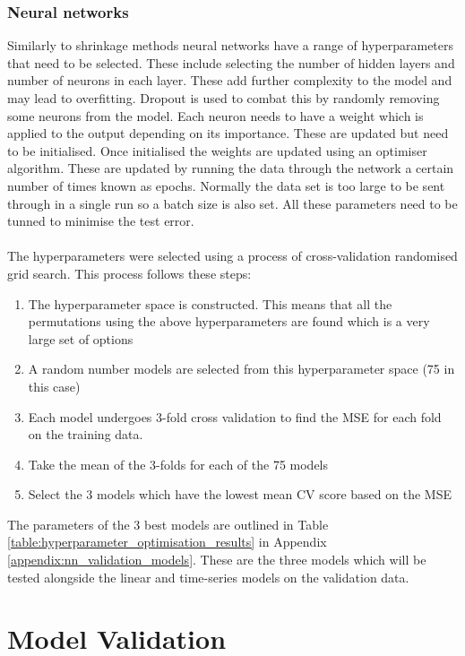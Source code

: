 \documentclass[11pt]{article}
\begin{document}
\subsubsection{Neural networks}

Similarly to shrinkage methods neural networks have a range of hyperparameters that need to be selected. These include selecting the number of hidden layers and number of neurons in each layer. These add further complexity to the model and may lead to overfitting. Dropout is used to combat this by randomly removing some neurons from the model. Each neuron needs to have a weight which is applied to the output depending on its importance. These are updated but need to be initialised. Once initialised the weights are updated using an optimiser algorithm. These are updated by running the data through the network a certain number of times known as epochs. Normally the data set is too large to be sent through in a single run so a batch size is also set. All these parameters need to be tunned to minimise the test error.
\\
\\
The hyperparameters were selected using a process of cross-validation randomised grid search. This process follows these steps: 

\begin{enumerate}
\item The hyperparameter space is constructed. This means that all the permutations using the above hyperparameters are found which is a very large set of options 
\item A random number models are selected from this hyperparameter space (75 in this case) 
\item Each model undergoes 3-fold cross validation to find the MSE for each fold on the training data.
\item Take the mean of the 3-folds for each of the 75 models
\item Select the 3 models which have the lowest mean CV score based on the MSE
\end{enumerate}

\noindent The parameters of the 3 best models are outlined in Table \ref{table:hyperparameter_optimisation_results} in Appendix \ref{appendix:nn_validation_models}. These are the three models which will be tested alongside the linear and time-series models on the validation data.


\section{Model Validation}
\end{document}
